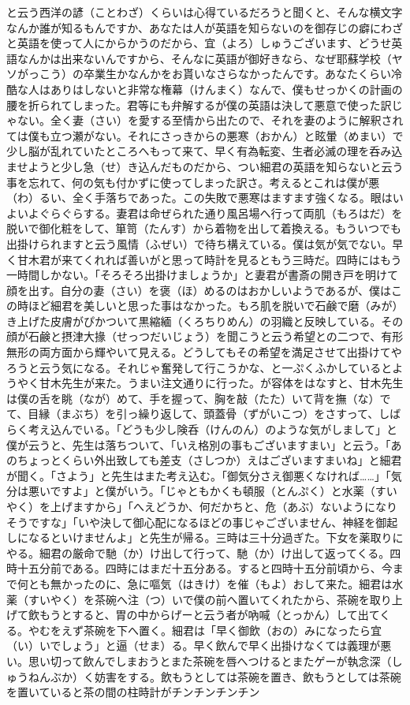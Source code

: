 \documentclass{book}
\begin{document}
と云う西洋の諺（ことわざ）くらいは心得ているだろうと聞くと、そんな横文字なんか誰が知るもんですか、あなたは人が英語を知らないのを御存じの癖にわざと英語を使って人にからかうのだから、宜（よろ）しゅうございます、どうせ英語なんかは出来ないんですから、そんなに英語が御好きなら、なぜ耶蘇学校（ヤソがっこう）の卒業生かなんかをお貰いなさらなかったんです。あなたくらい冷酷な人はありはしないと非常な権幕（けんまく）なんで、僕もせっかくの計画の腰を折られてしまった。君等にも弁解するが僕の英語は決して悪意で使った訳じゃない。全く妻（さい）を愛する至情から出たので、それを妻のように解釈されては僕も立つ瀬がない。それにさっきからの悪寒（おかん）と眩暈（めまい）で少し脳が乱れていたところへもって来て、早く有為転変、生者必滅の理を呑み込ませようと少し急（せ）き込んだものだから、つい細君の英語を知らないと云う事を忘れて、何の気も付かずに使ってしまった訳さ。考えるとこれは僕が悪（わ）るい、全く手落ちであった。この失敗で悪寒はますます強くなる。眼はいよいよぐらぐらする。妻君は命ぜられた通り風呂場へ行って両肌（もろはだ）を脱いで御化粧をして、箪笥（たんす）から着物を出して着換える。もういつでも出掛けられますと云う風情（ふぜい）で待ち構えている。僕は気が気でない。早く甘木君が来てくれれば善いがと思って時計を見るともう三時だ。四時にはもう一時間しかない。「そろそろ出掛けましょうか」と妻君が書斎の開き戸を明けて顔を出す。自分の妻（さい）を褒（ほ）めるのはおかしいようであるが、僕はこの時ほど細君を美しいと思った事はなかった。もろ肌を脱いで石鹸で磨（みが）き上げた皮膚がぴかついて黒縮緬（くろちりめん）の羽織と反映している。その顔が石鹸と摂津大掾（せっつだいじょう）を聞こうと云う希望との二つで、有形無形の両方面から輝やいて見える。どうしてもその希望を満足させて出掛けてやろうと云う気になる。それじゃ奮発して行こうかな、と一ぷくふかしているとようやく甘木先生が来た。うまい注文通りに行った。が容体をはなすと、甘木先生は僕の舌を眺（なが）めて、手を握って、胸を敲（たた）いて背を撫（な）でて、目縁（まぶち）を引っ繰り返して、頭蓋骨（ずがいこつ）をさすって、しばらく考え込んでいる。「どうも少し険呑（けんのん）のような気がしまして」と僕が云うと、先生は落ちついて、「いえ格別の事もございますまい」と云う。「あのちょっとくらい外出致しても差支（さしつか）えはございますまいね」と細君が聞く。「さよう」と先生はまた考え込む。「御気分さえ御悪くなければ\ldots{}\ldots{}」「気分は悪いですよ」と僕がいう。「じゃともかくも頓服（とんぷく）と水薬（すいやく）を上げますから」「へえどうか、何だかちと、危（あぶ）ないようになりそうですな」「いや決して御心配になるほどの事じゃございません、神経を御起しになるといけませんよ」と先生が帰る。三時は三十分過ぎた。下女を薬取りにやる。細君の厳命で馳（か）け出して行って、馳（か）け出して返ってくる。四時十五分前である。四時にはまだ十五分ある。すると四時十五分前頃から、今まで何とも無かったのに、急に嘔気（はきけ）を催（もよ）おして来た。細君は水薬（すいやく）を茶碗へ注（つ）いで僕の前へ置いてくれたから、茶碗を取り上げて飲もうとすると、胃の中からげーと云う者が吶喊（とっかん）して出てくる。やむをえず茶碗を下へ置く。細君は「早く御飲（おの）みになったら宜（い）いでしょう」と逼（せま）る。早く飲んで早く出掛けなくては義理が悪い。思い切って飲んでしまおうとまた茶碗を唇へつけるとまたゲーが執念深（しゅうねんぶか）く妨害をする。飲もうとしては茶碗を置き、飲もうとしては茶碗を置いていると茶の間の柱時計がチンチンチンチン
\end{document}
